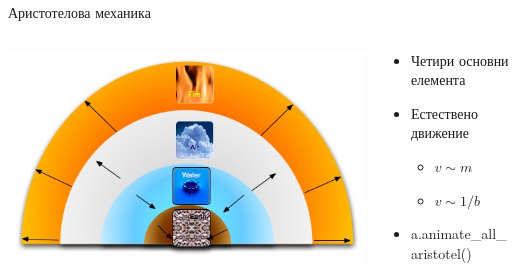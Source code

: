 \documentclass[10pt,a4paper]{beamer}
\begin{document}
        \begin{frame}{ Аристотелова механика }
			\begin{columns}
				\begin{column}{0.6\textwidth}
					\includegraphics[width=\textwidth]{images/aristotle_four_elements_motion.jpg}
				\end{column}
				\begin{column}{0.4\textwidth}
					\begin{itemize}
						\item Четири основни елемента
                        \item Естествено движение \begin{itemize}
                            \item $ v \sim m $
                            \item $ v \sim 1/b $
                        \end{itemize}
                        \item a.animate\_all\_aristotel()
					\end{itemize}
				\end{column}
			\end{columns}
        \end{frame}
    
\end{document}
